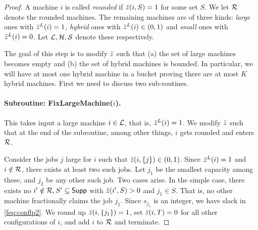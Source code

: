 \begin{proof}
A machine $i$ is called {\em rounded} if $\bar z(i,S) = 1$ for some set $S$. We let ${\cal R}$ denote the rounded machines.
The remaining machines are of three kinds:  {\em large} ones with $\bar z^L(i) = 1$, {\em hybrid} ones with $\bar z^L(i) \in (0,1)$ and {\em small} ones with $\bar z^L(i) = 0$.
Let ${\cal L},{\cal H},{\cal S}$ denote these respectively.  \medskip



The goal of this step is to modify $\bar z$ such that (a) the set of large machines becomes empty and (b) the set of hybrid machines is bounded. In particular, we will have at most one hybrid machine in a bucket
proving there are at most $K$ hybrid machines. First we need to discuss two sub-routines.

\paragraph{Subroutine: {\sf FixLargeMachine}($i$).}
This takes input a large machine $i\in{\cal L}$, that is,  $\bar z^L(i) = 1$. We modify $\bar z$ such that at the end of the subroutine, among other things, $i$ gets rounded and enters ${\cal R}$.

Consider the jobs $j$ large for $i$ such that $\bar z(i,\{j\}) \in (0,1)$. Since $\bar z^L(i) = 1$ and $i\notin {\cal R}$, there exists at least two such jobs.
%
Let $j_1$ be the smallest capacity among these, and $j_2$  be any other such job. %
Two cases arise. In the simple case, there exists no $i'\notin {\cal R}, S'\subseteq \mathsf{Supp}$ with $\bar z(i',S) > 0$ and $j_1 \in S$. That is, no other machine fractionally claims the job $j_1$.
Since $s_{j_1}$ is an integer, we have slack in \eqref{feq:conflp2}. We round up $\bar z(i,\{j_1\}) = 1$, set $\bar z(i,T) = 0$ for all other configurations of $i$, and add $i$ to ${\cal R}$ and terminate.
%


\end{proof}

